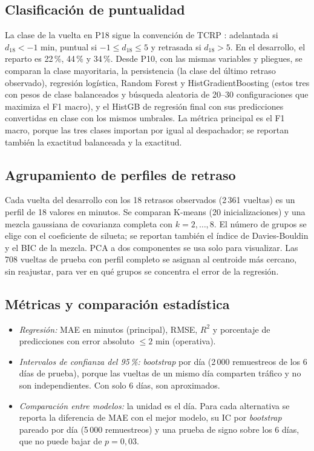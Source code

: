 \documentclass[conference,spanish]{IEEEtran}
\begin{document}
\subsection{Clasificación de puntualidad}\label{sec:clases}
La clase de la vuelta en P18 sigue la convención de TCRP \cite{tcrp2003}: adelantada si $d_{18}<-1$ min, puntual si $-1\le d_{18}\le5$ y retrasada si $d_{18}>5$. En el desarrollo, el reparto es 22\,\%, 44\,\% y 34\,\%. Desde P10, con las mismas variables y pliegues, se comparan la clase mayoritaria, la persistencia (la clase del último retraso observado), regresión logística, Random Forest y HistGradientBoosting (estos tres con pesos de clase balanceados y búsqueda aleatoria de 20--30 configuraciones que maximiza el F1 macro), y el HistGB de regresión final con sus predicciones convertidas en clase con los mismos umbrales. La métrica principal es el F1 macro, porque las tres clases importan por igual al despachador; se reportan también la exactitud balanceada y la exactitud.

\subsection{Agrupamiento de perfiles de retraso}
Cada vuelta del desarrollo con los 18 retrasos observados (2\,361 vueltas) es un perfil de 18 valores en minutos. Se comparan K-means (20 inicializaciones) y una mezcla gaussiana de covarianza completa con $k=2,\dots,8$. El número de grupos se elige con el coeficiente de silueta; se reportan también el índice de Davies-Bouldin y el BIC de la mezcla. PCA a dos componentes se usa solo para visualizar. Las 708 vueltas de prueba con perfil completo se asignan al centroide más cercano, sin reajustar, para ver en qué grupos se concentra el error de la regresión.

\subsection{Métricas y comparación estadística}
\begin{itemize}
    \item \emph{Regresión:} MAE en minutos (principal), RMSE, $R^2$ y porcentaje de predicciones con error absoluto $\le2$ min (operativa).
    \item \emph{Intervalos de confianza del 95\,\%:} \textit{bootstrap} por día (2\,000 remuestreos de los 6 días de prueba), porque las vueltas de un mismo día comparten tráfico y no son independientes. Con solo 6 días, son aproximados.
    \item \emph{Comparación entre modelos:} la unidad es el día. Para cada alternativa se reporta la diferencia de MAE con el mejor modelo, su IC por \textit{bootstrap} pareado por día (5\,000 remuestreos) y una prueba de signo sobre los 6 días, que no puede bajar de $p=0{,}03$.
\end{itemize}
\end{document}
